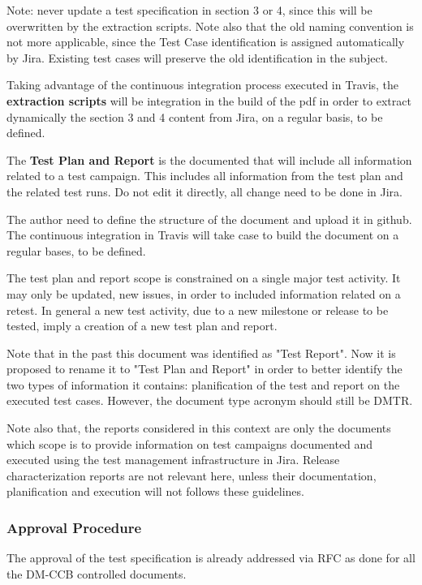 Note: never update a test specification in section 3 or 4, since this will be overwritten by the extraction scripts. Note also that the old naming convention is not more applicable, since the Test Case identification is assigned automatically by Jira. Existing test cases will preserve the old identification in the subject.

Taking advantage of the continuous integration process executed in Travis, the {\bf extraction scripts} will be integration in the build of the pdf in order to extract dynamically the section 3 and 4 content from Jira, on a regular basis, to be defined.


The {\bf Test Plan and Report} is the documented that will include all information related to a test campaign. 
This includes all information from the test plan and the related test runs. 
Do not edit it directly, all change need to be done in Jira.

The author need to define the structure of the document and upload it in github. The continuous integration in Travis will take case to build the document on a regular bases, to be defined.

The test plan and report scope is constrained on a single major test activity. It may only be updated, new issues, in order to included information related on a retest.
In general a new test activity, due to a new milestone or release to be tested, imply a creation of a new test plan and report.

Note that in the past this document was identified as "Test Report".
Now it is proposed to rename it to "Test Plan and Report" in order to better identify the two types of information it contains: planification of the test and report on the executed test cases. However, the document type acronym should still be DMTR. 

Note also that, the reports considered in this context are only the documents which scope is to provide information on test campaigns documented and executed using the test management infrastructure in Jira. Release characterization reports are not relevant here, unless their documentation, planification and execution will not follows these guidelines.


\subsubsection{Approval Procedure}

The approval of the test specification is already addressed via RFC as done for all the DM-CCB controlled documents.

